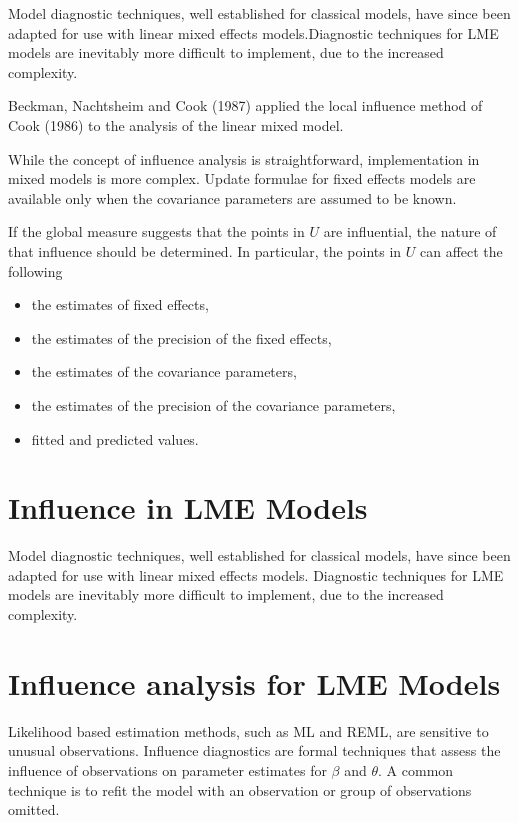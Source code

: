 \documentclass[12pt, a4paper]{article}
\begin{document}
Model diagnostic techniques, well established for classical models, have since been adapted for use with linear mixed effects models.Diagnostic techniques for LME models are inevitably more difficult to implement, due to the increased complexity.

Beckman, Nachtsheim and Cook (1987)  applied the local influence method of Cook (1986) to the analysis of the linear mixed model.

While the concept of influence analysis is straightforward, implementation in mixed models is more complex. Update formulae for fixed effects models are available only when the covariance parameters are assumed to be known.

If the global measure suggests that the points in $U$ are influential, the nature of that influence should be determined. In particular, the points in $U$ can affect the following

\begin{itemize}
	\item the estimates of fixed effects,
	\item the estimates of the precision of the fixed effects,
	\item the estimates of the covariance parameters,
	\item the estimates of the precision of the covariance parameters,
	\item fitted and predicted values.
\end{itemize}




	\section{Influence in LME Models}
	
	Model diagnostic techniques, well established for classical models, have since been adapted for use with linear mixed effects models. Diagnostic techniques for LME models are inevitably more difficult to implement, due to the increased complexity.
	
	\section{Influence analysis for LME Models} %
	
	Likelihood based estimation methods, such as ML and REML, are sensitive to unusual observations. Influence diagnostics are formal techniques that assess the influence of observations on parameter estimates for $\beta$ and $\theta$. A common technique is to refit the model with an observation or group of observations omitted.
	
\end{document}
